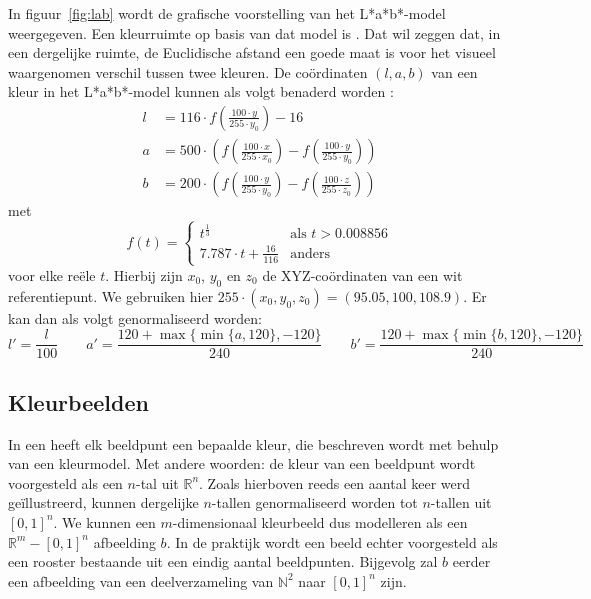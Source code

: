 In figuur~\ref{fig:lab} wordt de grafische voorstelling van het L*a*b*-model weergegeven. 
Een kleurruimte op basis van dat model is  
\cite{sharma:digital_color_imaging}. Dat wil zeggen dat, in een dergelijke 
ruimte, de Euclidische afstand een goede maat is voor het visueel waargenomen verschil 
tussen twee kleuren. De co\"ordinaten $(l,a,b)$ van een kleur in het 
L*a*b*-model kunnen als volgt benaderd worden
\cite{debaets:similariteitsmaten_voor_kleurbeelden, philips:beeldverwerking}:
\begin{align*}
l & = 116 \cdot f({\scriptstyle\frac{100 \cdot y}{255 \cdot y_0}}) - 16 \\[2pt] 
a & = 500 \cdot \left(f({\scriptstyle\frac{\scriptstyle 100 \cdot x}{\scriptstyle 255 \cdot x_0}}) - f({\scriptstyle\frac{\scriptstyle 100 \cdot y}{\scriptstyle 255 \cdot y_0}})\right) \\[2pt] 
b & = 200 \cdot \left(f({\scriptstyle\frac{\scriptstyle 100 \cdot y}{\scriptstyle 255 \cdot y_0}}) - f({\scriptstyle\frac{\scriptstyle 100 \cdot z}{\scriptstyle 255 \cdot z_0}})\right)
\end{align*}
met
\begin{displaymath}
f(t) = \begin{cases} 
t^\frac{1}{3} & \textrm{als } t > 0.008856 \\ 
7.787 \cdot t + \frac{16}{116} & \textrm{anders}
\end{cases}
\end{displaymath}
voor elke re\"ele $t$. Hierbij zijn $x_0$, $y_0$ en $z_0$ de
XYZ-co\"ordinaten van een wit referentiepunt. We gebruiken hier 
$255 \cdot (x_0,y_0,z_0)=(95.05,100,108.9)$.
Er kan dan als volgt genormaliseerd worden:
\begin{displaymath}
l' = \frac{l}{100} \qquad a' = \frac{120 + 
\max\{\min\{a,120\},-120\}}{240} \qquad b' = \frac{120 + \max\{\min\{b,120\},-120\}}{240}
\end{displaymath}


\subsection{Kleurbeelden}

In een  heeft elk beeldpunt een bepaalde kleur, die beschreven wordt met
behulp van een kleurmodel. Met andere woorden: de kleur van een beeldpunt wordt voorgesteld 
als een $n$-tal uit
$\mathbb{R}^n$. Zoals hierboven reeds een aantal keer werd ge\"illustreerd, kunnen dergelijke 
$n$-tallen genormaliseerd worden tot $n$-tallen uit $[0,1]^n$. We kunnen een $m$-dimensionaal 
kleurbeeld dus modelleren als een $\mathbb{R}^m - [0,1]^n$ afbeelding $b$. 
In de praktijk wordt een beeld echter voorgesteld als een rooster bestaande uit een
eindig aantal beeldpunten. Bijgevolg zal $b$ eerder een afbeelding van een deelverzameling van 
$\mathbb{N}^2$ naar $[0,1]^n$ zijn. 

